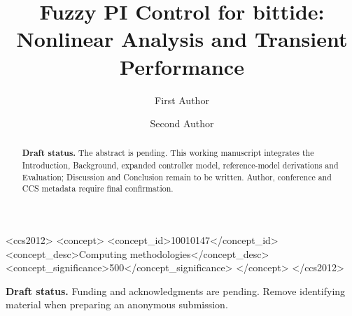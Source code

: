 \documentclass[sigconf]{acmart}
\begin{document}
\title[Fuzzy PI Control for bittide]{Fuzzy PI Control for bittide: Nonlinear Analysis and Transient Performance}

\author{First Author}

\author{Second Author}

\renewcommand{\shortauthors}{First Author and Second Author}

\begin{abstract}
\textbf{Draft status.} The abstract is pending. This working manuscript
integrates the Introduction, Background, expanded controller model,
reference-model derivations and Evaluation; Discussion and Conclusion
remain to be written. Author, conference and CCS metadata require final confirmation.
\end{abstract}


\begin{CCSXML}
<ccs2012>
 <concept>
  <concept_id>10010147</concept_id>
  <concept_desc>Computing methodologies</concept_desc>
  <concept_significance>500</concept_significance>
 </concept>
</ccs2012>
\end{CCSXML}

\maketitle









\begin{acks}
\textbf{Draft status.} Funding and acknowledgments are pending. Remove
identifying material when preparing an anonymous submission.
\end{acks}



\end{document}
